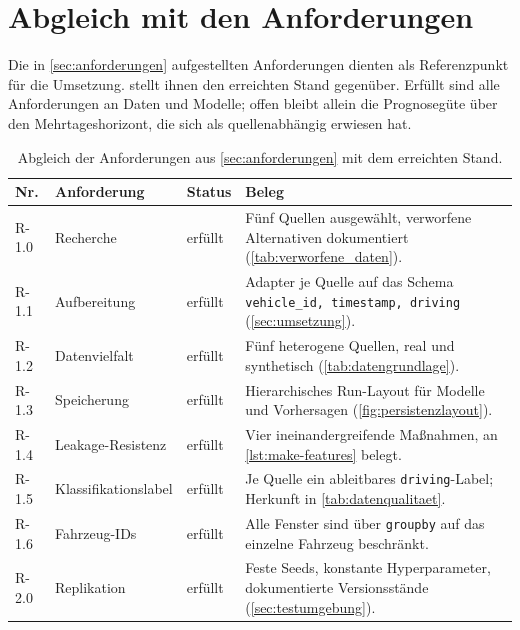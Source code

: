 \section{Abgleich mit den Anforderungen}
\label{sec:anforderungsabgleich}

Die in \cref{sec:anforderungen} aufgestellten Anforderungen dienten als
Referenzpunkt für die Umsetzung.  stellt ihnen den
erreichten Stand gegenüber. Erfüllt sind alle Anforderungen an Daten und
Modelle; offen bleibt allein die Prognosegüte über den Mehrtageshorizont, die
sich als quellenabhängig erwiesen hat.

\begin{table}[H]
    \centering
    \small
    \caption{Abgleich der Anforderungen aus \cref{sec:anforderungen} mit dem
    erreichten Stand.}
    \label{tab:abgleich}
    \begin{tabularx}{\textwidth}{@{}l l l X@{}}
        \toprule
        \textbf{Nr.} & \textbf{Anforderung} & \textbf{Status} & \textbf{Beleg} \\
        \midrule
        R-1.0 & Recherche & erfüllt & Fünf Quellen ausgewählt, verworfene Alternativen dokumentiert (\cref{tab:verworfene_daten}). \\
        \addlinespace
        R-1.1 & Aufbereitung & erfüllt & Adapter je Quelle auf das Schema \texttt{vehicle\_id, timestamp, driving} (\cref{sec:umsetzung}). \\
        \addlinespace
        R-1.2 & Datenvielfalt & erfüllt & Fünf heterogene Quellen, real und synthetisch (\cref{tab:datengrundlage}). \\
        \addlinespace
        R-1.3 & Speicherung & erfüllt & Hierarchisches Run-Layout für Modelle und Vorhersagen (\cref{fig:persistenzlayout}). \\
        \addlinespace
        R-1.4 & Leakage-Resistenz & erfüllt & Vier ineinandergreifende Maßnahmen, an \cref{lst:make-features} belegt. \\
        \addlinespace
        R-1.5 & Klassifikationslabel & erfüllt & Je Quelle ein ableitbares \texttt{driving}-Label; Herkunft in \cref{tab:datenqualitaet}. \\
        \addlinespace
        R-1.6 & Fahrzeug-IDs & erfüllt & Alle Fenster sind über \texttt{groupby} auf das einzelne Fahrzeug beschränkt. \\
        \addlinespace
        R-2.0 & Replikation & erfüllt & Feste Seeds, konstante Hyperparameter, dokumentierte Versionsstände (\cref{sec:testumgebung}). \\

\end{tabularx}
\end{table}
